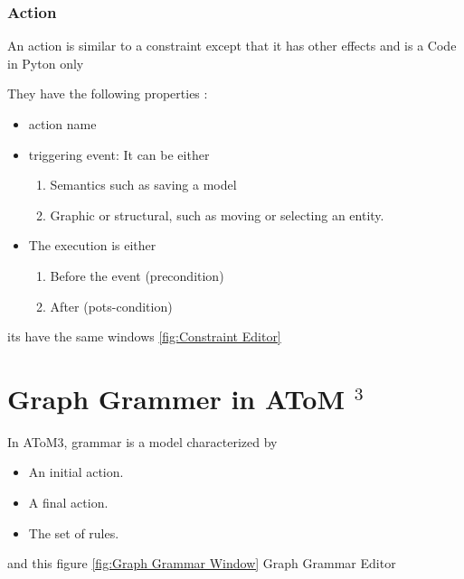 \subsubsection{ Action }

An action is similar to a constraint except that it has other effects and is a
Code in Pyton only

They have the following properties :
\begin{itemize}
\item action name
\item triggering event: It can be either
	\begin{enumerate}
	\item Semantics such as saving a model
	\item Graphic or structural, such as moving or selecting an entity.
	\end{enumerate}
	
\item The execution is either
	\begin{enumerate}
	\item Before the event (precondition)
	\item  After (pots-condition) 
	\end{enumerate}

\end{itemize}
its have the same windows \ref{fig:Constraint Editor}  


\section{ Graph Grammer in AToM $^{3}$ }
In AToM3, grammar is a model characterized by
\begin{itemize}
\item An initial action.
\item A final action.
\item The set of rules. 
\end{itemize}
and this figure \ref{fig:Graph Grammar Window} Graph Grammar Editor
 
